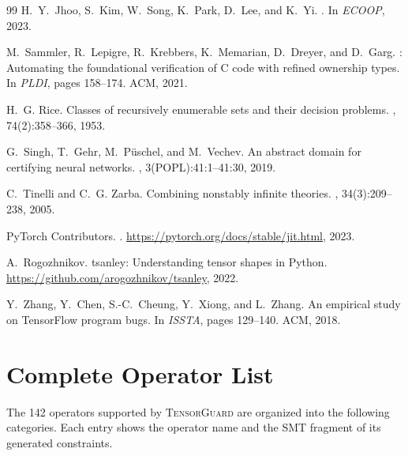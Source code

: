 \documentclass[10pt]{article}
\newcommand{\tguard}{\textsc{TensorGuard}}
\theoremstyle{plain}
\theoremstyle{definition}
\theoremstyle{remark}
\begin{document}
\begin{thebibliography}{99}
H.~Y.~Jhoo, S.~Kim, W.~Song, K.~Park, D.~Lee, and K.~Yi.
.
\newblock In {\em ECOOP}, 2023.

M.~Sammler, R.~Lepigre, R.~Krebbers, K.~Memarian, D.~Dreyer,
  and D.~Garg.
: Automating the foundational verification of
  {C} code with refined ownership types.
\newblock In {\em PLDI}, pages 158--174. ACM, 2021.

H.~G. Rice.
\newblock Classes of recursively enumerable sets and their decision problems.
, 74(2):358--366, 1953.

G.~Singh, T.~Gehr, M.~P\"uschel, and M.~Vechev.
\newblock An abstract domain for certifying neural networks.
, 3(POPL):41:1--41:30, 2019.

C.~Tinelli and C.~G. Zarba.
\newblock Combining nonstably infinite theories.
, 34(3):209--238, 2005.

PyTorch Contributors.
.
\newblock \url{https://pytorch.org/docs/stable/jit.html}, 2023.

A.~Rogozhnikov.
\newblock tsanley: Understanding tensor shapes in {Python}.
\newblock \url{https://github.com/arogozhnikov/tsanley}, 2022.

Y.~Zhang, Y.~Chen, S.-C.~Cheung, Y.~Xiong, and L.~Zhang.
\newblock An empirical study on {TensorFlow} program bugs.
\newblock In {\em ISSTA}, pages 129--140. ACM, 2018.

\end{thebibliography}


\appendix

\section{Complete Operator List}\label{app:operators}

The 142 operators supported by \tguard{} are organized into the
following categories.  Each entry shows the operator name and the
SMT fragment of its generated constraints.
\end{document}
